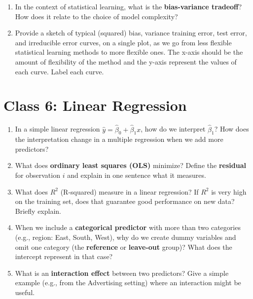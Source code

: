\documentclass[11pt]{article}
\begin{document}
\begin{enumerate}[leftmargin=*]
\item In the context of statistical learning, what is the \textbf{bias-variance tradeoff}? How does it relate to the choice of model complexity?

\item Provide a sketch of typical (squared) bias, variance training error, test error, and irreducible error curves, on a single plot, as we go from less flexible statistical learning methods to more flexible ones. The x-axis should be the amount of flexibility of the method and the y-axis represent the values of each curve. Label each curve. 
\end{enumerate}

\section*{Class 6: Linear Regression}

\begin{enumerate}[leftmargin=*, resume]

\item In a simple linear regression $\hat{y} = \hat{\beta}_0 + \hat{\beta}_1 x$, how do we interpret $\hat{\beta}_1$? How does the interpretation change in a multiple regression when we add more predictors?

\item What does \textbf{ordinary least squares (OLS)} minimize? Define the \textbf{residual} for observation $i$ and explain in one sentence what it measures.

\item What does $R^2$ (R-squared) measure in a linear regression? If $R^2$ is very high on the training set, does that guarantee good performance on new data? Briefly explain.

\item When we include a \textbf{categorical predictor} with more than two categories (e.g., region: East, South, West), why do we create dummy variables and omit one category (the \textbf{reference} or \textbf{leave-out} group)? What does the intercept represent in that case?

\item What is an \textbf{interaction effect} between two predictors? Give a simple example (e.g., from the Advertising setting) where an interaction might be useful.

\end{enumerate}
\end{document}
